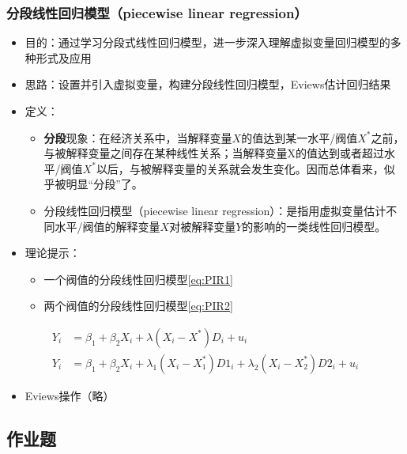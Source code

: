 \documentclass[12pt,(landscape,a4paper),(portrait,a4paper)]{article}
\providecommand{\tightlist}{%
  \setlength{\itemsep}{0pt}\setlength{\parskip}{0pt}}
\theoremstyle{definition}
\theoremstyle{definition}
\theoremstyle{definition}
\theoremstyle{remark}
\begin{document}
\hypertarget{piecewise}{%
\subsubsection{分段线性回归模型（piecewise linear
regression）}\label{piecewise}}

\begin{itemize}
\tightlist
\item
  目的：通过学习分段式线性回归模型，进一步深入理解虚拟变量回归模型的多种形式及应用
\item
  思路：设置并引入虚拟变量，构建分段线性回归模型，Eviews估计回归结果
\item
  定义：

  \begin{itemize}
  \tightlist
  \item
    \textbf{分段}现象：在经济关系中，当解释变量\(X\)的值达到某一水平/阀值\(X^\ast\)之前，与被解释变量之间存在某种线性关系；当解释变量X的值达到或者超过水平/阀值\(X^\ast\)以后，与被解释变量的关系就会发生变化。因而总体看来，似乎被明显``分段''了。
  \item
    分段线性回归模型（piecewise linear
    regression）：是指用虚拟变量估计不同水平/阀值的解释变量\(X\)对被解释变量\(Y\)的影响的一类线性回归模型。
  \end{itemize}
\item
  理论提示：

  \begin{itemize}
  \tightlist
  \item
    一个阀值的分段线性回归模型\eqref{eq:PIR1}
  \item
    两个阀值的分段线性回归模型\eqref{eq:PIR2}
  \end{itemize}
\end{itemize}

\begin{align}
Y_i & =\beta_1+\beta_2X_i+\lambda(X_i-X^{\ast})D_i+u_i \label{eq:PIR1}\\
Y_i & =\beta_1+\beta_2X_i+\lambda_1(X_i-X^{\ast}_1)D1_i+\lambda_2(X_i-X^{\ast}_2)D2_i+u_i \label{eq:PIR2}
\end{align}

\begin{itemize}
\tightlist
\item
  Eviews操作（略）
\end{itemize}

\subsection{作业题}
\end{document}
